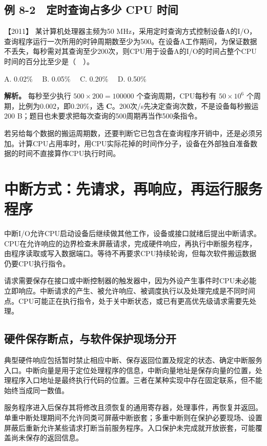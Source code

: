 \subsection{例 8-2　定时查询占多少 CPU 时间}\label{co-ex8-2}

\noindent{}【2011】 某计算机处理器主频为50 MHz，采用定时查询方式控制设备A的I/O，查询程序运行一次所用的时钟周期数至少为500。在设备A工作期间，为保证数据不丢失，每秒需对其查询至少200次，则CPU用于设备A的I/O的时间占整个CPU时间的百分比至少是（　）。

A. 0.02\%　 B. 0.05\%　 C. 0.20\%　 D. 0.50\%


\textbf{解析。} 每秒至少执行 \(500\times200=100000\) 个查询周期，CPU每秒有 \(50\times10^6\) 个周期，比例为0.002，即0.20\%，选 \textbf{C}。200次/s先决定查询次数，不是设备每秒搬运200 B；题目也未要求把每次查询的500周期再当作500条指令。

若另给每个数据的搬运周期数，还要判断它已包含在查询程序开销中，还是必须另加。计算CPU占用率时，用CPU实际花掉的时间作分子，设备在外部独自准备数据的时间不直接算作CPU执行时间。

\section{中断方式：先请求，再响应，再运行服务程序}\label{co-08-03}

中断I/O允许CPU启动设备后继续做其他工作，设备或接口就绪后提出中断请求。CPU在允许响应的边界检查未屏蔽请求，完成硬件响应，再执行中断服务程序，由程序读取或写入数据端口。等待不再要求CPU持续轮询，但每次软件搬运数据仍要CPU执行指令。

请求需要保存在接口或中断控制器的触发器中，因为外设产生事件时CPU未必能立即响应。中断请求的产生、被允许响应、被调度执行以及处理完成是不同时间点。CPU可能正在执行指令，处于关中断状态，或已有更高优先级请求需要先处理。

\subsection{硬件保存断点，与软件保护现场分开}\label{co-c08-h55}

典型硬件响应包括暂时禁止相应中断、保存返回位置及规定的状态、确定中断服务入口。中断向量是用于定位处理程序的信息，中断向量地址是保存向量的位置，处理程序入口地址是最终执行代码的位置。三者在某种实现中存在固定联系，但不能始终当成同一数值。

服务程序进入后保存其将修改且须恢复的通用寄存器，处理事件，再恢复并返回。单重中断处理期间不允许同类可屏蔽中断嵌套；多重中断则在保护必要现场、设置屏蔽后重新允许某些请求打断当前服务程序。入口保护未完成就开放嵌套，可能覆盖尚未保存的返回信息。

